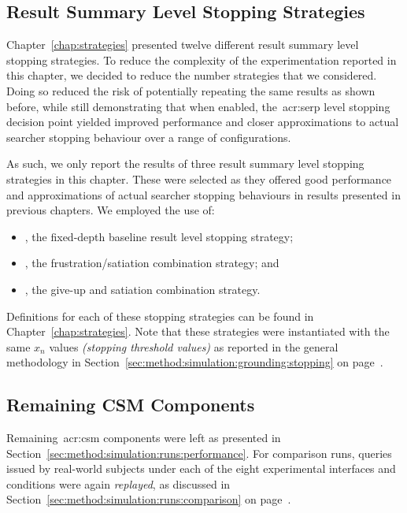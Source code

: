 \subsection{Result Summary Level Stopping Strategies}\label{sec:serp:method:snippet}
Chapter~\ref{chap:strategies} presented twelve different result summary level stopping strategies. To reduce the complexity of the experimentation reported in this chapter, we decided to reduce the number strategies that we considered. Doing so reduced the risk of potentially repeating the same results as shown before, while still demonstrating that when enabled, the~\gls{acr:serp} level stopping decision point yielded improved performance and closer approximations to actual searcher stopping behaviour over a range of configurations.

As such, we only report the results of three result summary level stopping strategies in this chapter. These were selected as they offered good performance and approximations of actual searcher stopping behaviours in results presented in previous chapters. We employed the use of:

\begin{itemize}
    \item{, the fixed-depth baseline result level stopping strategy;}
    \item{, the frustration/satiation combination strategy; and}
    \item{, the give-up and satiation combination strategy.}
\end{itemize}

Definitions for each of these stopping strategies can be found in Chapter~\ref{chap:strategies}. Note that these strategies were instantiated with the same $x_n$ values \emph{(stopping threshold values)} as reported in the general methodology in Section~\ref{sec:method:simulation:grounding:stopping} on page~\pageref{sec:method:simulation:grounding:stopping}.

\subsection{Remaining CSM Components}\label{sec:serp:method:other}
Remaining~\gls{acr:csm} components were left as presented in Section~\ref{sec:method:simulation:runs:performance}. For comparison runs, queries issued by real-world subjects under each of the eight experimental interfaces and conditions were again \emph{replayed}, as discussed in Section~\ref{sec:method:simulation:runs:comparison} on page~\pageref{sec:method:simulation:runs:comparison}.

